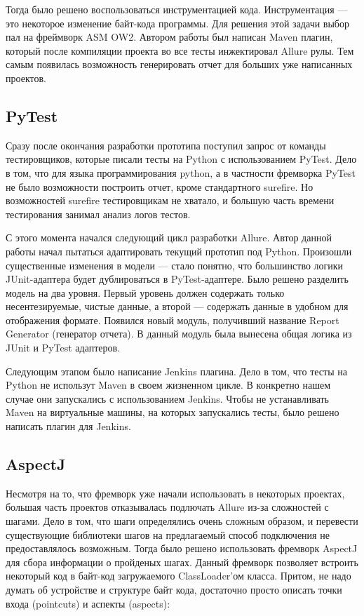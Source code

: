 Тогда было решено воспользоваться инструментацией кода. Инструментация --- это некоторое изменение байт-кода программы. Для решения этой задачи выбор пал на фреймворк ASM OW2. Автором работы был написан Maven плагин, который после компиляции проекта во все тесты инжектировал Allure рулы. Тем самым появилась возможность генерировать отчет для больших уже написанных проектов.

\subsection{PyTest}

Сразу после окончания разработки прототипа поступил запрос от команды тестировщиков, которые писали тесты на Python с использованием PyTest. Дело в том, что для языка программирования python, а в частности фремворка PyTest не было возможности построить отчет, кроме стандартного surefire. Но возможностей surefire тестировщикам не хватало, и большую часть времени тестирования занимал анализ логов тестов.

С этого момента начался следующий цикл разработки Allure. Автор данной работы начал пытаться адаптировать текущий прототип под Python. Произошли существенные изменения в модели --- стало понятно, что большинство логики JUnit-адаптера будет дублироваться в PyTest-адаптере.
Было решено разделить модель на два уровня. Первый уровень должен содержать только несентезируемые, чистые данные, а второй --- содержать данные в удобном для отображения формате. Появился новый модуль, получивший название Report Generator (генератор отчета). 
В данный модуль была вынесена общая логика из JUnit и PyTest адаптеров.

Следующим этапом было написание Jenkins плагина. Дело в том, что тесты на Python не использут Maven в своем жизненном цикле. В конкретно нашем случае они запускались с использованием Jenkins. Чтобы не устанавливать Maven на виртуальные машины, на которых запускались тесты, было решено написать плагин для Jenkins. 

\subsection{AspectJ}

Несмотря на то, что фремворк уже начали использовать в некоторых проектах, большая часть проектов отказывалась подлючать Allure из-за сложностей с шагами. Дело в том, что шаги определялись очень сложным образом, и перевести существующие библиотеки шагов на предлагаемый способ подключения не предоставлялось возможным. Тогда было решено использовать фремворк AspectJ для сбора информации о пройденых шагах. Данный фремворк позволяет встроить некоторый код в байт-код загружаемого ClassLoader'ом класса. Притом, не надо думать об устройстве и структуре байт кода, достаточно просто описать  точки входа (pointcuts) и аспекты (aspects): 

